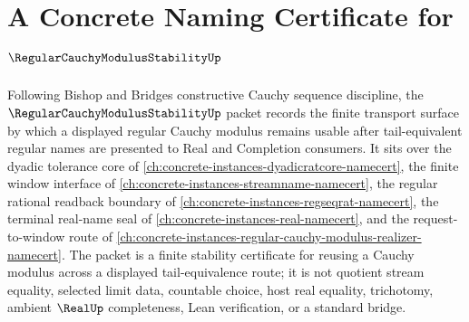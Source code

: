 \chapter{A Concrete Naming Certificate for $\RegularCauchyModulusStabilityUp$}
\label{ch:concrete-instances-regular-cauchy-modulus-stability-namecert}

Following Bishop and Bridges constructive Cauchy sequence discipline, the $\RegularCauchyModulusStabilityUp$ packet records the finite transport surface by which a displayed regular Cauchy modulus remains usable after tail-equivalent regular names are presented to Real and Completion consumers. It sits over the dyadic tolerance core of \autoref{ch:concrete-instances-dyadicratcore-namecert}, the finite window interface of \autoref{ch:concrete-instances-streamname-namecert}, the regular rational readback boundary of \autoref{ch:concrete-instances-regseqrat-namecert}, the terminal real-name seal of \autoref{ch:concrete-instances-real-namecert}, and the request-to-window route of \autoref{ch:concrete-instances-regular-cauchy-modulus-realizer-namecert}. The packet is a finite stability certificate for reusing a Cauchy modulus across a displayed tail-equivalence route; it is not quotient stream equality, selected limit data, countable choice, host real equality, trichotomy, ambient $\RealUp$ completeness, Lean verification, or a standard bridge.

